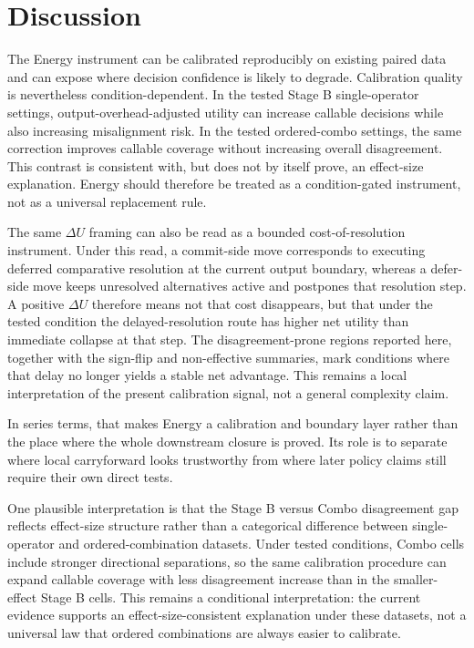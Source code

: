 \documentclass[11pt,a4paper]{article}
\begin{document}
\section{Discussion}
\label{sec:discussion}

The Energy instrument can be calibrated reproducibly on existing paired data and can expose where decision confidence is likely to degrade. Calibration quality is nevertheless condition-dependent. In the tested Stage B single-operator settings, output-overhead-adjusted utility can increase callable decisions while also increasing misalignment risk. In the tested ordered-combo settings, the same correction improves callable coverage without increasing overall disagreement. This contrast is consistent with, but does not by itself prove, an effect-size explanation. Energy should therefore be treated as a condition-gated instrument, not as a universal replacement rule.

The same $\Delta U$ framing can also be read as a bounded cost-of-resolution
instrument. Under this read, a commit-side move corresponds to executing
deferred comparative resolution at the current output boundary, whereas a
defer-side move keeps unresolved alternatives active and postpones that
resolution step. A positive $\Delta U$ therefore means not that cost
disappears, but that under the tested condition the delayed-resolution route
has higher net utility than immediate collapse at that step. The
disagreement-prone regions reported here, together with the sign-flip and
non-effective summaries, mark conditions where that delay no longer yields a
stable net advantage. This remains a local interpretation of the present
calibration signal, not a general complexity claim.

In series terms, that makes Energy a calibration and boundary layer rather than the
place where the whole downstream closure is proved. Its role is to separate where
local carryforward looks trustworthy from where later policy claims still require
their own direct tests.

One plausible interpretation is that the Stage B versus Combo disagreement gap reflects effect-size structure rather than a categorical difference between single-operator and ordered-combination datasets. Under tested conditions, Combo cells include stronger directional separations, so the same calibration procedure can expand callable coverage with less disagreement increase than in the smaller-effect Stage B cells. This remains a conditional interpretation: the current evidence supports an effect-size-consistent explanation under these datasets, not a universal law that ordered combinations are always easier to calibrate.
\end{document}
